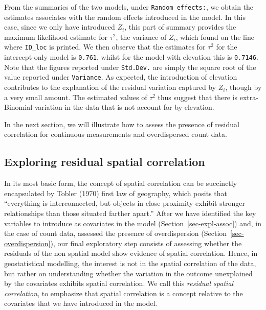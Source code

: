 \documentclass[
  letterpaper,
]{krantz}
\begin{document}
From the summaries of the two models, under \texttt{Random\ effects:},
we obtain the estimates associates with the random effects introduced in
the model. In this case, since we only have introduced \(Z_i\), this
part of summary provides the maximum likelihood estimate for \(\tau^2\),
the variance of \(Z_i\), which found on the line where \texttt{ID\_loc}
is printed. We then observe that the estimates for \(\tau^2\) for the
intercept-only model is \texttt{0.761}, whilst for the model with
elevation this is \texttt{0.7146}. Note that the figures reported under
\texttt{Std.Dev.} are simply the square root of the value reported under
\texttt{Variance}. As expected, the introduction of elevation
contributes to the explanation of the residual variation captured by
\(Z_i\), though by a very small amount. The estimated values of
\(\tau^2\) thus suggest that there is extra-Binomial variation in the
data that is not account for by elevation.

In the next section, we will illustrate how to assess the presence of
residual correlation for continuous measurements and overdispersed count
data.

\hypertarget{sec-expl-spatial}{%
\subsection{Exploring residual spatial
correlation}\label{sec-expl-spatial}}

In its most basic form, the concept of spatial correlation can be
succinctly encapsulated by Tobler (1970) first law of geography, which
posits that ``everything is interconnected, but objects in close
proximity exhibit stronger relationships than those situated farther
apart.'' After we have identified the key variables to introduce as
covariates in the model (Section~\ref{sec-expl-assoc}) and, in the case
of count data, assessed the presence of overdispersion
(Section~\ref{sec-overdispersion}), our final exploratory step consists
of assessing whether the residuals of the non spatial model show
evidence of spatial correlation. Hence, in geostatistical modelling, the
interest is not in the spatial correlation of the data, but rather on
understanding whether the variation in the outcome unexplained by the
covariates exhibits spatial correlation. We call this \emph{residual
spatial correlation}, to emphasize that spatial correlation is a concept
relative to the covariates that we have introduced in the model.
\end{document}
